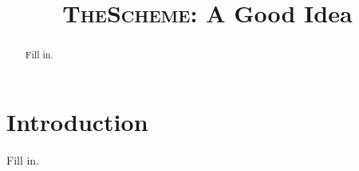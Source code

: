 \documentclass[preprint,10pt,numbers]{acg_sigplanconf_v32}
\newcommand{\Name}{\textsc{TheScheme}\xspace}
\begin{document}
\setlength{\pdfpageheight}{\paperheight}
\setlength{\pdfpagewidth}{\paperwidth}




\title{\Name: A Good Idea}

\authorinfo{}{}{}

\maketitle

\begin{abstract}
Fill in.
\end{abstract}



\section{Introduction}

Fill in.


\end{document}
